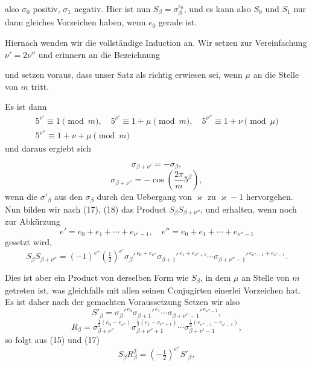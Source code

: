 
also $\sigma_0$ positiv, $\sigma_1$ negativ. Hier ist nun $S_\beta = \sigma_\beta^{e_0}$,
und es kann also $S_0$ und $S_1$ nur dann gleiches Vorzeichen haben, wenn $e_0$
gerade ist.

Hiernach wenden wir die vollständige Induction an. Wir
setzen zur Vereinfachung $\nu' = 2\nu''$ und erinnern an die Bezeichnung

und setzen voraus, dass unser Satz als richtig erwiesen sei, wenn
$\mu$ an die Stelle von $m$ tritt.

Es ist dann
\[
\begin{gathered}
5^{\nu'} \equiv 1 \pmod{m}, \quad 5^{\nu'} \equiv 1+\mu \pmod{m}, \quad 5^{\nu''} \equiv 1+\nu \pmod{\mu} \\
5^{\nu''} \equiv 1+\nu+\mu \pmod{m}
\end{gathered}
\]
und daraus ergiebt sich

\[
\sigma_{\beta+\nu'} = -\sigma_\beta,
\]
\[
\sigma_{\beta+\nu''} = -\cos\left(\frac{2\pi}{m}5^\beta\right),
\]
wenn die $\sigma'_\beta$ aus den $\sigma_\beta$ durch den Uebergang von $\varkappa$ zu
$\varkappa - 1$ hervorgehen. Nun bilden wir nach (17), (18) das Product
$S_\beta S_{\beta+\nu''}$, und erhalten, wenn noch zur Abkürzung
\[
e' = e_0 + e_1 + \cdots + e_{\nu'-1}, \quad e'' = e_0 + e_1 + \cdots + e_{\nu''-1}
\]
gesetzt wird,
\[
S_\beta S_{\beta+\nu''} = (-1)^{e''}\left(\tfrac{1}{2}\right)^{e'}\sigma_\beta'^{\,e_0+e_{\nu''}}\sigma_{\beta+1}'^{\,e_1+e_{\nu''+1}}\cdots\sigma_{\beta+\nu''-1}'^{\,e_{\nu''-1}+e_{\nu'-1}}.
\]

Dies ist aber ein Product von derselben Form wie $S_\beta$, in
dem $\mu$ an Stelle von $m$ getreten ist, was gleichfalls mit allen
seinen Conjugirten einerlei Vorzeichen hat. Es ist daher nach
der gemachten Voraussetzung
Setzen wir also
\[
S'_\beta = \sigma_\beta'^{\,e_0}\sigma_{\beta+1}'^{\,e_1}\cdots\sigma_{\beta+\nu''-1}'^{\,e_{\nu''-1}},
\]
\[
R_\beta = \sigma_{\beta+\nu''}^{\frac{1}{2}(e_0-e_{\nu''})}\sigma_{\beta+\nu''+1}^{\frac{1}{2}(e_1-e_{\nu''+1})}\cdots\sigma_{\beta+\nu'-1}^{\frac{1}{2}(e_{\nu''-1}-e_{\nu'-1})},
\]
so folgt aus (15) und (17)
\[
S_\beta R_\beta^2 = \left(-\tfrac{1}{2}\right)^{e''}S'_\beta,
\]
